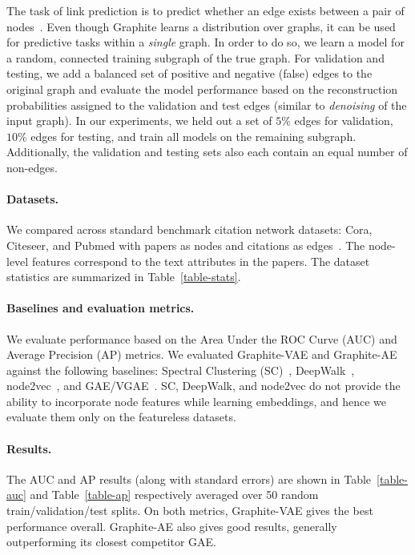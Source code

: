 \documentclass{article}
\newcommand{\name}{Graphite}
\begin{document}
The task of link prediction is to predict whether an edge exists between a pair of nodes~\citep{loehlin1998latent}. Even though \name{} learns a distribution over graphs, it can be used for predictive tasks within a \textit{single} graph. In order to do so, we learn a model for a random, connected training subgraph of the true graph. For validation and testing, we add a balanced set of positive and negative (false) edges to the original graph and evaluate the model performance based on the reconstruction probabilities assigned to the validation and test edges (similar to \textit{denoising} of the input graph). In our experiments, we held out a set of $5\%$ edges for validation, $10\%$ edges for testing, and train all models on the remaining subgraph. Additionally, the validation and testing sets also each contain an equal number of non-edges.

 \paragraph{Datasets.} We compared across standard benchmark citation network datasets: Cora, Citeseer, and Pubmed with papers as nodes and citations as edges~\citep{sen2008networks}. 
 The node-level features correspond to the text attributes in the papers.
The dataset statistics are summarized in Table~\ref{table-stats}.

\paragraph{Baselines and evaluation metrics.} We evaluate performance based on the Area Under the ROC Curve (AUC) and Average Precision (AP) metrics. We evaluated \name{}-VAE and \name{}-AE against the following baselines: Spectral Clustering (SC)~\citep{tang2011leveraging}, DeepWalk~\citep{perozzi2014deepwalk}, node2vec~\citep{grover2016node2vec}, and GAE/VGAE~\citep{kipf2016variational}. SC, DeepWalk, and node2vec do not provide the ability to incorporate node features while learning embeddings, and hence we evaluate them only on the featureless datasets. 



\paragraph{Results.} The AUC and AP results (along with standard errors) are shown in Table~\ref{table-auc} and Table~\ref{table-ap} respectively averaged over 50 random train/validation/test splits. 
On both metrics, \name{}-VAE gives the best performance overall. \name{}-AE also gives good results, generally outperforming its closest competitor GAE.  
\end{document}
